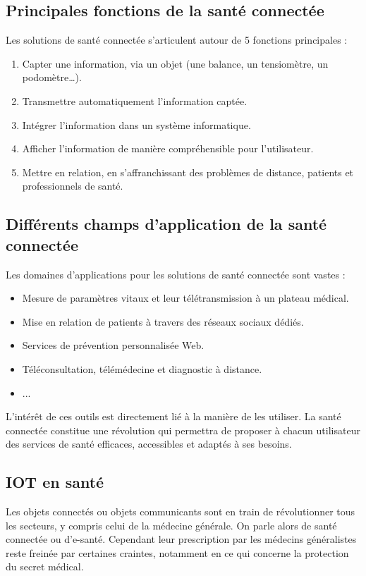 \documentclass[12pt]{article}
\begin{document}
\subsection{Principales fonctions de la santé connectée}
Les solutions de santé connectée s’articulent autour de 5 fonctions principales :
\begin{enumerate}
	\item Capter une information, via un objet (une balance, un tensiomètre, un podomètre…).
	\item Transmettre automatiquement l’information captée.
	\item Intégrer l’information dans un système informatique.
	\item Afficher l’information de manière compréhensible pour l’utilisateur.
	\item Mettre en relation, en s’affranchissant des problèmes de distance, patients et professionnels de santé.
\end{enumerate}

\subsection{Différents champs d’application de la santé connectée}
Les domaines d’applications pour les solutions de santé connectée sont vastes :
\begin{itemize}
	\item Mesure de paramètres vitaux et leur télétransmission à un plateau médical.
	\item Mise en relation de patients à travers des réseaux sociaux dédiés.
	\item Services de prévention personnalisée Web.
	\item Téléconsultation, télémédecine et diagnostic à distance.
	\item ...\\
\end{itemize}

L’intérêt de ces outils est directement lié à la manière de les utiliser. La santé connectée constitue une révolution qui permettra de proposer à chacun utilisateur des services de santé efficaces, accessibles et adaptés à ses besoins.

\subsection{IOT en santé}
Les objets connectés ou objets communicants sont en train de révolutionner tous les secteurs, y compris celui de la médecine générale. On parle alors de santé connectée ou d’e-santé. Cependant leur prescription par les médecins généralistes reste freinée par certaines craintes, notamment en ce qui concerne la protection du secret médical.
\end{document}

